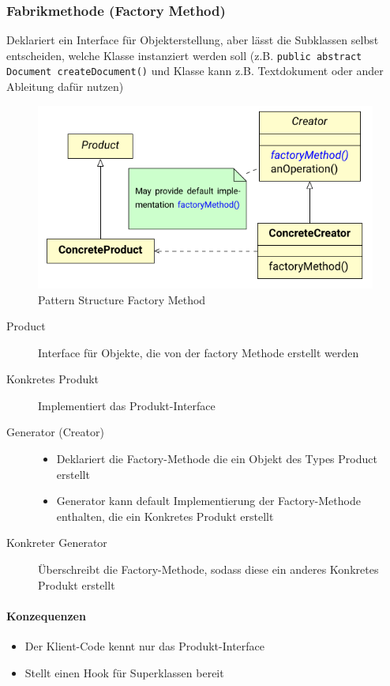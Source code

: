 \documentclass[
    ngerman,
    color=3b,
    summary,
    boxarc,
    main,
]{rubos-tuda-template}
\begin{document}
\subsubsection{Fabrikmethode (Factory Method)}
\begin{definition}
    Deklariert ein Interface für Objekterstellung, aber lässt die Subklassen selbst entscheiden, welche Klasse instanziert werden soll (z.B. \texttt{public abstract Document createDocument()} und Klasse kann z.B. Textdokument oder ander Ableitung dafür nutzen)
\end{definition}
\begin{figure}[ht]
    \centering
    \includegraphics[width=.5\textwidth]{bilder/factory_method_pattern.pdf}
    \caption{Pattern Structure Factory Method}
\end{figure}
\FloatBarrier
\begin{description}
    \item[Product] Interface für Objekte, die von der factory Methode erstellt werden
    \item[Konkretes Produkt] Implementiert das Produkt-Interface
    \item[Generator (Creator)] \begin{itemize}
              \item Deklariert die Factory-Methode die ein Objekt des Types Product erstellt
              \item Generator kann default Implementierung der Factory-Methode enthalten, die ein Konkretes Produkt erstellt
          \end{itemize}
    \item[Konkreter Generator] Überschreibt die Factory-Methode, sodass diese ein anderes Konkretes Produkt erstellt
\end{description}
\paragraph{Konzequenzen}
\begin{itemize}
    \item Der Klient-Code kennt nur das Produkt-Interface
    \item Stellt einen Hook für Superklassen bereit
\end{itemize}
\end{document}
